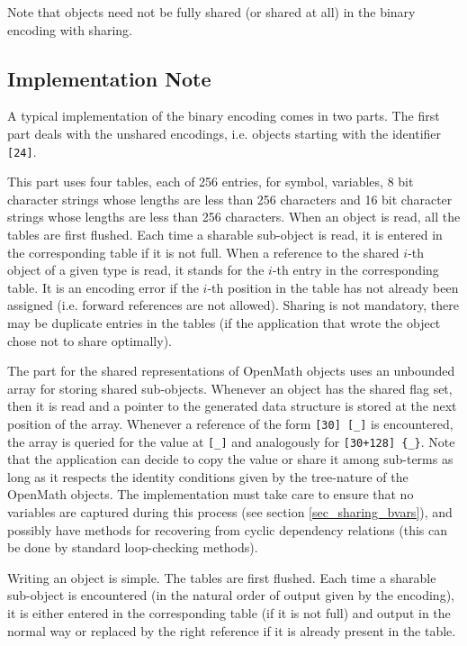\documentclass{report}
\def\OM{OpenMath\xspace}
\begin{document}
Note that objects need not be fully shared (or shared at all) in the binary encoding with
sharing.

\subsection{Implementation Note}\label{sec_impl_note}
  
A typical implementation of the binary encoding comes in two parts. The first part deals
with the unshared encodings, i.e. objects starting with the identifier \lstinline|[24]|.
  
This part uses four tables, each of 256 entries, for symbol, variables, 8 bit character
strings whose lengths are less than 256 characters and 16 bit character strings whose
lengths are less than 256 characters.  When an object is read, all the tables are first
flushed. Each time a sharable sub-object is read, it is entered in the corresponding table
if it is not full. When a reference to the shared $i$-th object of a given type is read,
it stands for the $i$-th entry in the corresponding table. It is an encoding error if the
$i$-th position in the table has not already been assigned (i.e. forward references are
not allowed).  Sharing is not mandatory, there may be duplicate entries in the tables (if
the application that wrote the object chose not to share optimally).
  
The part for the shared representations of \OM objects uses an unbounded array for storing
shared sub-objects. Whenever an object has the shared flag set, then it is read and a
pointer to the generated data structure is stored at the next position of the
array. Whenever a reference of the form \lstinline|[30] [_]| is encountered, the array is
queried for the value at \lstinline|[_]| and analogously for \lstinline|[30+128] {_}|. 
Note that the application can decide to copy the value or share it among sub-terms
as long as it respects the identity conditions given by the tree-nature of the \OM
objects.  The implementation must take care to ensure that no variables are captured
during this process (see section \ref{sec_sharing_bvars}), and possibly have methods for
recovering from cyclic dependency relations (this can be done by standard loop-checking
methods).
  
Writing an object is simple. The tables are first flushed. Each time a sharable sub-object
is encountered (in the natural order of output given by the encoding), it is either
entered in the corresponding table (if it is not full) and output in the normal way or
replaced by the right reference if it is already present in the table.
\end{document}
